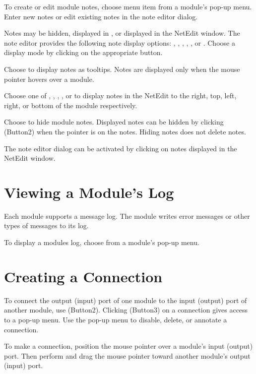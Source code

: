 To create or edit module notes, choose menu item  from
a module's pop-up menu. Enter new notes or edit existing notes in
the note editor dialog.

Notes may be hidden, displayed in , or displayed in the
NetEdit window.  The note editor provides the following note display
options: , , ,
, , or .  Choose a
display mode by clicking  on the appropriate button.

Choose  to display notes as tooltips.  Notes are
displayed only when the mouse pointer hovers over a module.

Choose one of , , ,
, or  to display notes in the
NetEdit to the right, top, left, right, or bottom of the module
respectively. 

Choose  to hide module notes.  Displayed notes can be
hidden by clicking \keyboard(Button2) when the pointer is on the
notes.  Hiding notes does not delete notes.

The note editor dialog can be activated by clicking 
on notes displayed in the NetEdit window.


\section{Viewing a Module's Log}
\label{sec:viewmodslog}

Each module supports a message log. The module writes error messages
or other types of messages to its log.

To display a modules log, choose  from a module's
pop-up menu.


\section{Creating a Connection}
\label{sec:connectmods}

To connect the output (input) port of one module to the input (output)
port of another module, use \keyboard(Button2). Clicking
\keyboard(Button3) on a connection gives access to a pop-up menu. Use
the pop-up menu to disable, delete, or annotate a connection.

To make a connection, position the mouse pointer over a module's input
(output) port.  Then perform  and drag the
mouse pointer toward another module's output (input) port.

